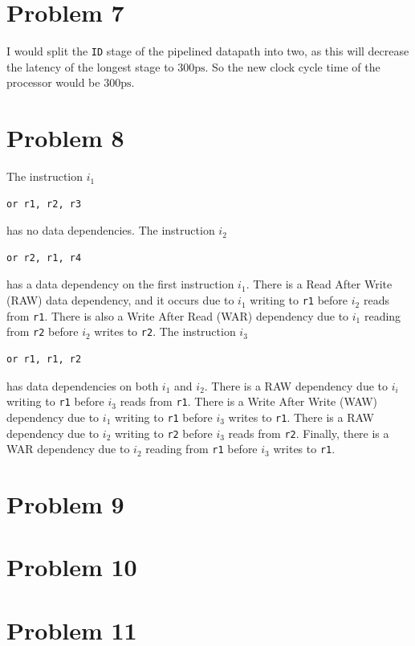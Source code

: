 \documentclass[12pt]{article}
\begin{document}
\section*{Problem 7}

I would split the \texttt{ID} stage of the pipelined datapath into two, as this will decrease the latency of the longest stage to \(300\text{ps}\). So
the new clock cycle time of the processor would be \(300\text{ps}\).

\section*{Problem 8}

The instruction \(i_1\)
\begin{verbatim}
or r1, r2, r3
\end{verbatim}
has no data dependencies. The instruction \(i_2\)
\begin{verbatim}
or r2, r1, r4
\end{verbatim}
has a data dependency on the first instruction \(i_1\). There is a Read After Write (RAW) data dependency, and it occurs due to \(i_1\) writing to
\texttt{r1} before \(i_2\) reads from \texttt{r1}. There is also a Write After Read (WAR) dependency due to \(i_1\) reading from \texttt{r2} before
\(i_2\) writes to \texttt{r2}.
The instruction \(i_3\)
\begin{verbatim}
or r1, r1, r2
\end{verbatim}
has data dependencies on both \(i_1\) and \(i_2\). There is a RAW dependency due to \(i_i\) writing to \texttt{r1} before \(i_3\) reads from \texttt{r1}.
There is a Write After Write (WAW) dependency due to \(i_1\) writing to \texttt{r1} before \(i_3\) writes to \texttt{r1}. There is a RAW dependency due to
\(i_2\) writing to \texttt{r2} before \(i_3\) reads from \texttt{r2}. Finally, there is a WAR dependency due to \(i_2\) reading from \texttt{r1} before \(i_3\)
writes to \texttt{r1}.

\section*{Problem 9}

\section*{Problem 10}

\section*{Problem 11}
\end{document}
